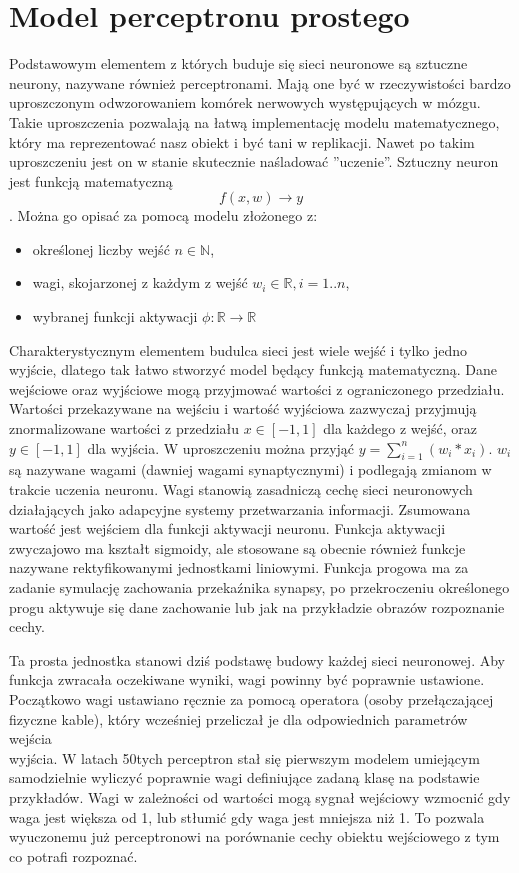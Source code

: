 \documentclass[12pt,a4paper,twoside,titlepage,openright]{book}
\begin{document}
\section{Model perceptronu prostego}
Podstawowym elementem z których buduje się sieci neuronowe są sztuczne neurony, nazywane również perceptronami. Mają one być w rzeczywistości bardzo uproszczonym odwzorowaniem komórek nerwowych występujących w mózgu. Takie uproszczenia pozwalają na łatwą implementację modelu matematycznego, który ma reprezentować nasz obiekt i być tani w replikacji. Nawet po takim uproszczeniu jest on w stanie skutecznie naśladować ''uczenie''.
Sztuczny neuron jest funkcją matematyczną $$f(x,w) \to y$$. Można go opisać za pomocą modelu złożonego z:
\begin{itemize}
\item określonej liczby wejść \(n \in \mathbb{N}\),
\item wagi, skojarzonej z każdym z wejść \(w_i \in \mathbb{R}, i=1..n\),
\item wybranej funkcji aktywacji \(\phi: \mathbb{R} \to \mathbb{R} \)
\end{itemize}

Charakterystycznym elementem budulca sieci jest wiele wejść i tylko jedno wyjście, dlatego tak łatwo stworzyć model będący funkcją matematyczną.
Dane wejściowe oraz wyjściowe mogą przyjmować wartości z ograniczonego przedziału. Wartości przekazywane na wejściu i wartość wyjściowa zazwyczaj przyjmują znormalizowane wartości z przedziału \(x \in [-1, 1]\) dla każdego z wejść, oraz \(y \in [-1,1]\) dla wyjścia. W uproszczeniu można przyjąć \(y = \sum\limits_{i=1}^n (w_i * x_i)\). \(w_i\) są nazywane wagami (dawniej wagami synaptycznymi) i podlegają zmianom w trakcie uczenia neuronu. Wagi stanowią zasadniczą cechę sieci neuronowych działających jako adapcyjne systemy przetwarzania informacji. Zsumowana wartość jest wejściem dla funkcji aktywacji neuronu. Funkcja aktywacji zwyczajowo ma kształt sigmoidy, ale stosowane są obecnie również funkcje nazywane rektyfikowanymi jednostkami liniowymi. Funkcja progowa ma za zadanie symulację zachowania przekaźnika synapsy, po przekroczeniu określonego progu aktywuje się dane zachowanie lub jak na przykładzie obrazów rozpoznanie cechy.

Ta prosta jednostka stanowi dziś podstawę budowy każdej sieci neuronowej. Aby funkcja zwracała oczekiwane wyniki, wagi powinny być poprawnie ustawione. Początkowo wagi ustawiano ręcznie za pomocą operatora (osoby przełączającej fizyczne kable), który wcześniej przeliczał je dla odpowiednich parametrów wejścia\\wyjścia. W latach 50tych perceptron stał się pierwszym modelem umiejącym samodzielnie wyliczyć poprawnie wagi definiujące zadaną klasę na podstawie przykładów. Wagi w zależności od wartości mogą sygnał wejściowy wzmocnić gdy waga jest większa od 1, lub stłumić gdy waga jest mniejsza niż 1. To pozwala wyuczonemu już perceptronowi na porównanie cechy obiektu wejściowego z tym co potrafi rozpoznać.
\end{document}
